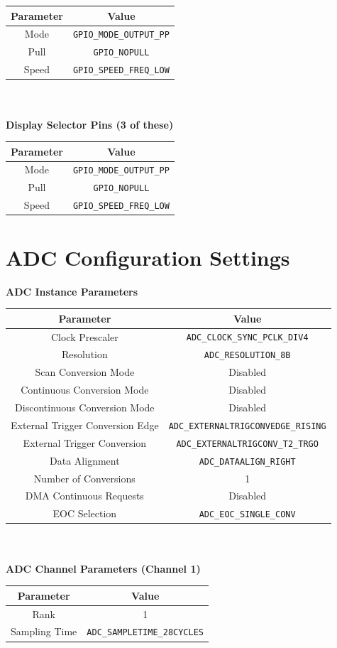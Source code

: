 \documentclass[12pt]{report}
\begin{document}
\begin{appendix}
\begin{tabular}{|c|c|}
		\hline
		Parameter & Value\\\hline
		Mode & \texttt{GPIO\_MODE\_OUTPUT\_PP}\\\hline
		Pull & \texttt{GPIO\_NOPULL}\\\hline
		Speed & \texttt{GPIO\_SPEED\_FREQ\_LOW}\\\hline
	\end{tabular}
	\newline
	\\\\
	\textbf{Display Selector Pins (3 of these)}\\
	\begin{tabular}{|c|c|}
		\hline
		Parameter & Value\\\hline
		Mode & \texttt{GPIO\_MODE\_OUTPUT\_PP}\\\hline
		Pull & \texttt{GPIO\_NOPULL}\\\hline
		Speed & \texttt{GPIO\_SPEED\_FREQ\_LOW}\\\hline
	\end{tabular}
	\newline
	\newpage
	\chapter{ADC Configuration Settings}\label{appendixadc}
	\textbf{ADC Instance Parameters}\\
	\begin{tabular}{|c|c|}
		\hline
		Parameter & Value\\\hline
		Clock Prescaler & \texttt{ADC\_CLOCK\_SYNC\_PCLK\_DIV4}\\\hline
		Resolution & \texttt{ADC\_RESOLUTION\_8B}\\\hline
		Scan Conversion Mode & Disabled\\\hline
		Continuous Conversion Mode & Disabled\\\hline
		Discontinuous Conversion Mode & Disabled\\\hline
		External Trigger Conversion Edge & \texttt{ADC\_EXTERNALTRIGCONVEDGE\_RISING}\\\hline
		External Trigger Conversion & \texttt{ADC\_EXTERNALTRIGCONV\_T2\_TRGO}\\\hline
		Data Alignment & \texttt{ADC\_DATAALIGN\_RIGHT}\\\hline
		Number of Conversions & 1\\\hline
		DMA Continuous Requests & Disabled\\\hline
		EOC Selection & \texttt{ADC\_EOC\_SINGLE\_CONV}\\\hline
	\end{tabular}
	\newline
	\\\\
	\textbf{ADC Channel Parameters (Channel 1)}\\
	\begin{tabular}{|c|c|}
		\hline
		Parameter & Value\\\hline
		Rank & 1\\\hline
		Sampling Time & \texttt{ADC\_SAMPLETIME\_28CYCLES}\\\hline
	\end{tabular}
	\newpage
	

\end{appendix}
\end{document}
